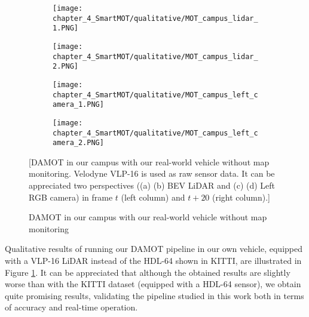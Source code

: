 \begin{figure}[h]
	\centering
	\begin{subfigure}{0.43\textwidth}
		\captionsetup{justification=centering}
		\texttt{[image: chapter\_4\_SmartMOT/qualitative/MOT\_campus\_lidar\_1.PNG]}
		\caption{}
	\end{subfigure}
	\hfill
	\begin{subfigure}{0.43\textwidth}
		\captionsetup{justification=centering}
		\texttt{[image: chapter\_4\_SmartMOT/qualitative/MOT\_campus\_lidar\_2.PNG]}
		\caption{}
	\end{subfigure}
	\hfill
	\begin{subfigure}{0.43\textwidth}
		\captionsetup{justification=centering}
		\texttt{[image: chapter\_4\_SmartMOT/qualitative/MOT\_campus\_left\_camera\_1.PNG]}
		\caption{}
	\end{subfigure}
	\hfill
	\begin{subfigure}{0.43\textwidth}
		\captionsetup{justification=centering}
		\texttt{[image: chapter\_4\_SmartMOT/qualitative/MOT\_campus\_left\_camera\_2.PNG]}
		\caption{}
	\end{subfigure}
	\captionsetup{justification=justified}
	\caption{\ac{DAMOT} in our campus with our real-world vehicle without map monitoring}[\ac{DAMOT} in our campus with our real-world vehicle without map monitoring. Velodyne VLP-16 is used as raw sensor data. It can be appreciated two perspectives ((a) (b) \ac{BEV} \ac{LiDAR} and (c) (d) Left RGB camera) in frame $t$ (left column) and $t+20$ (right column).]
	\label{fig:chapter_4_SmartMOT/MOT_campus}
\end{figure}

Qualitative results of running our \ac{DAMOT} pipeline in our own vehicle, equipped with a VLP-16 \ac{LiDAR} instead of the HDL-64 shown in KITTI, are illustrated in Figure \ref{fig:chapter_4_SmartMOT/MOT_campus}. It can be appreciated that although the obtained results are slightly worse than with the KITTI dataset (equipped with a HDL-64 sensor), we obtain quite promising results, validating the pipeline studied in this work both in terms of accuracy and real-time operation.

